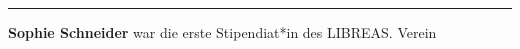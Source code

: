 \begin{center}\rule{0.5\linewidth}{\linethickness}\end{center}

\textbf{Sophie Schneider} war die erste Stipendiat*in des LIBREAS.
Verein

